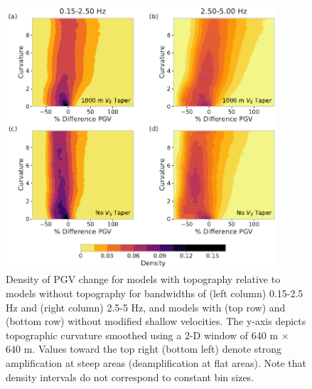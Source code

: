 \begin{figure}[!ht]
  \centering
  \includegraphics[width=0.9\textwidth,height=0.9\textheight,keepaspectratio]{figures/figure_highf_14.pdf}
  \caption{
 Density of PGV change for models with topography relative to models without topography for bandwidths of (left column) 0.15-2.5 Hz and (right column) 2.5-5 Hz, and models with (top row) and (bottom row) without modified shallow velocities. The y-axis depicts topographic curvature smoothed using a 2-D window of 640 m $\times$ 640 m. Values toward the top right (bottom left) denote strong amplification at steep areas (deamplification at flat areas). Note that density intervals do not correspond to constant bin sizes.}
  \label{fig:highf-14}
\end{figure}
\clearpage


